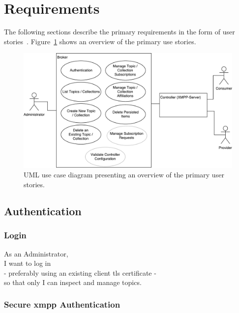 
\section{Requirements}\label{sec:requirements}

The following sections describe the primary requirements in the form of user stories~\cite{agile-alliance-user-stories}.
Figure~\ref{fig:requirements-overview} shows an overview of the primary use stories.

\begin{figure}[h]
    \centering
    \includegraphics[width=1\linewidth]{resources/requirements_overview}
    \caption{UML use case diagram presenting an overview of the primary user stories.}
    \label{fig:requirements-overview}
\end{figure}

\subsection{Authentication}\label{sec:authentication}
\subsubsection{Login}

As an Administrator,\\
I want to log in\\
- preferably using an existing client \gls{tls} certificate - \\
so that only I can inspect and manage topics.\\

\subsubsection{Secure \gls{xmpp} Authentication}

